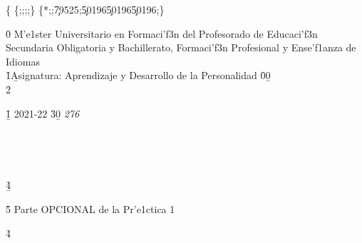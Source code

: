 \documentclass[
]{article}
\author{}
\date{}
\begin{document}
\{\ansi{}
\{;;;;\}
\{*\expandedcolortbl;;\csgray\c79525;\csgenericrgb\c50196\c50196\c50196;\}

\trowd {}  
\trbrdrt\brdrnil \trbrdrl\brdrnil \trbrdrb\brdrs{}
\trbrdrr\brdrnil  \clvertalt \clshdrawnil {}
\clbrdrt\brdrs{} \clbrdrl\brdrs{}
\clbrdrb\brdrs{} \clbrdrr\brdrs{} 
 \gaph{}
\clvertalt \clshdrawnil {}
\clbrdrt\brdrs{} \clbrdrl\brdrs{}
\clbrdrb\brdrs{} \clbrdrr\brdrs{} 
 \gaph{}
\pard\intbl{}\tqc{}\tqr{}\qj{}

\f0  M'e1ster Universitario en Formaci'f3n del Profesorado de
Educaci'f3n Secundaria Obligatoria y Bachillerato, Formaci'f3n
Profesional y Ense'f1anza de Idiomas\\
\f1\b Asignatura: Aprendizaje y Desarrollo de la Personalidad \f0\b0\\
\f2 \cell 
\pard\intbl{}\tqc{}\tqr{}\qr{}

\f1\b {} 2021-22 \f3\b0 \cell \lastrow\row
\pard{}\sl276\qj{}

 \\
\pard{}

 \\
\pard{}

\f4\b {}\\
\pard{}

\f5  Parte OPCIONAL de la Pr'e1ctica 1\\
\pard{}

\f4 \\
\pard{}
\end{document}
